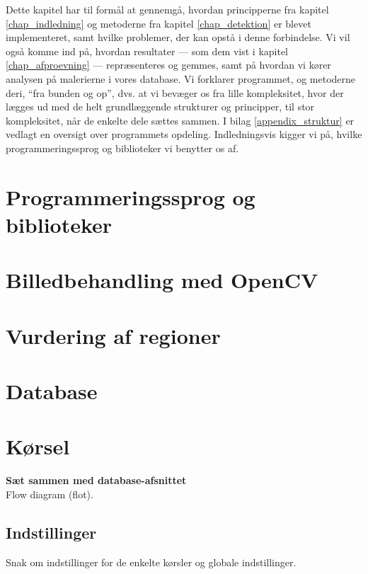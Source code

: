 {
{\sffamily Dette kapitel har til formål at gennemgå, hvordan
principperne fra kapitel \ref{chap_indledning} og metoderne fra kapitel
\ref{chap_detektion} er blevet implementeret, samt hvilke problemer, der
kan opstå i denne forbindelse. Vi vil også komme ind på, hvordan
resultater --- som dem vist i kapitel \ref{chap_afproevning} ---
repræsenteres og gemmes, samt på hvordan vi kører analysen på malerierne
i vores database.  Vi forklarer programmet, og metoderne deri, ``fra
bunden og op'', dvs. at vi bevæger os fra lille kompleksitet, hvor der
lægges ud med de helt grundlæggende strukturer og principper, til stor
kompleksitet, når de enkelte dele sættes sammen.  I bilag
\ref{appendix_struktur} er vedlagt en oversigt over programmets opdeling.
Indledningsvis kigger vi på, hvilke programmeringssprog og biblioteker
vi benytter os af.
}

\section{Programmeringssprog og biblioteker\label{section_programmeringssprog}}


\section{Billedbehandling med OpenCV\label{section_impBilledbehandling}}


\section{Vurdering af regioner\label{section_vurdering_regioner}}


\section{Database\label{section_imp_database}}


\section{Kørsel\label{section_koersel}}
\textbf{Sæt sammen med database-afsnittet}\\
Flow diagram (flot).
\subsection{Indstillinger}
Snak om indstillinger for de enkelte kørsler og globale indstillinger.

}

